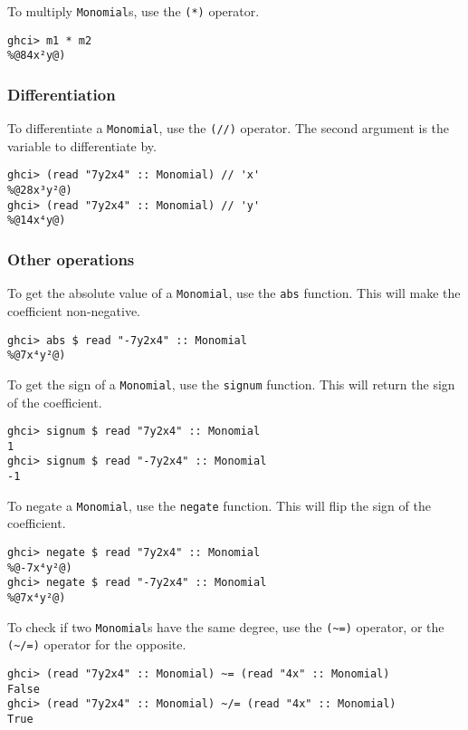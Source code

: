 \documentclass[11pt,a4paper]{article}
\begin{document}
To multiply \lstinline{Monomial}s, use the \lstinline{(*)} operator.

\begin{lstlisting}
ghci> m1 * m2
%@84x²y@)
\end{lstlisting}

\subsubsection{Differentiation}

To differentiate a \lstinline{Monomial}, use the \lstinline{(//)} operator.
The second argument is the variable to differentiate by.

\begin{lstlisting}
ghci> (read "7y2x4" :: Monomial) // 'x'
%@28x³y²@)
ghci> (read "7y2x4" :: Monomial) // 'y'
%@14x⁴y@)
\end{lstlisting}

\subsubsection{Other operations}

To get the absolute value of a \lstinline{Monomial}, use the \lstinline{abs} function.
This will make the coefficient non-negative.

\begin{lstlisting}
ghci> abs $ read "-7y2x4" :: Monomial
%@7x⁴y²@)
\end{lstlisting}

To get the sign of a \lstinline{Monomial}, use the \lstinline{signum} function.
This will return the sign of the coefficient.

\begin{lstlisting}
ghci> signum $ read "7y2x4" :: Monomial
1
ghci> signum $ read "-7y2x4" :: Monomial
-1
\end{lstlisting}

To negate a \lstinline{Monomial}, use the \lstinline{negate} function.
This will flip the sign of the coefficient.

\begin{lstlisting}
ghci> negate $ read "7y2x4" :: Monomial
%@-7x⁴y²@)
ghci> negate $ read "-7y2x4" :: Monomial
%@7x⁴y²@)
\end{lstlisting}

To check if two \lstinline{Monomial}s have the same degree, use the \lstinline{(~=)} operator, or the \lstinline{(~/=)} operator for the opposite.

\begin{lstlisting}
ghci> (read "7y2x4" :: Monomial) ~= (read "4x" :: Monomial)
False
ghci> (read "7y2x4" :: Monomial) ~/= (read "4x" :: Monomial)
True
\end{lstlisting}
\end{document}
